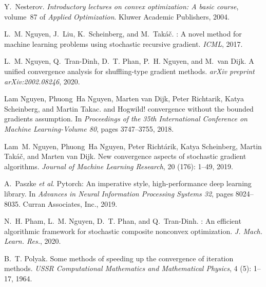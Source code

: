 \begin{thebibliography}{42}
Y.~Nesterov.
\newblock \emph{{I}ntroductory lectures on convex optimization: {A} basic
  course}, volume~87 of \emph{Applied Optimization}.
\newblock Kluwer Academic Publishers, 2004.

L.~M. Nguyen, J.~Liu, K.~Scheinberg, and M.~Tak{\'a}{\v{c}}.
: {A} novel method for machine learning problems using
  stochastic recursive gradient.
\newblock \emph{ICML}, 2017.

L.~M. Nguyen, Q.~Tran-Dinh, D.~T. Phan, P.~H. Nguyen, and M.~van Dijk.
\newblock A unified convergence analysis for shuffling-type gradient methods.
\newblock \emph{arXiv preprint arXiv:2002.08246}, 2020.

Lam Nguyen, Phuong~Ha Nguyen, Marten van Dijk, Peter Richtarik, Katya
  Scheinberg, and Martin Takac.
 and {H}ogwild! convergence without the bounded gradients
  assumption.
\newblock In \emph{Proceedings of the 35th International Conference on Machine
  Learning-Volume 80}, pages 3747--3755, 2018.
  
Lam~M. Nguyen, Phuong~Ha Nguyen, Peter Richt{{\'a}}rik, Katya Scheinberg,
  Martin Tak{{\'a}}{\v{c}}, and Marten van Dijk.
\newblock New convergence aspects of stochastic gradient algorithms.
\newblock \emph{Journal of Machine Learning Research}, 20
  (176): 1--49, 2019{}.

A.~Paszke {\emph{et al}}.
\newblock Pytorch: An imperative style, high-performance deep learning library.
\newblock In \emph{Advances in Neural Information Processing Systems 32}, pages
  8024--8035. Curran Associates, Inc., 2019.

N.~H. Pham, L.~M. Nguyen, D.~T. Phan, and Q.~Tran-Dinh.
: {A}n efficient algorithmic framework for stochastic
  composite nonconvex optimization.
\newblock \emph{J. Mach. Learn. Res.}, 2020.

B.~T. Polyak.
\newblock Some methods of speeding up the convergence of iteration methods.
\newblock \emph{USSR Computational Mathematics and Mathematical Physics},
  4 (5): 1--17, 1964.


\end{thebibliography}

